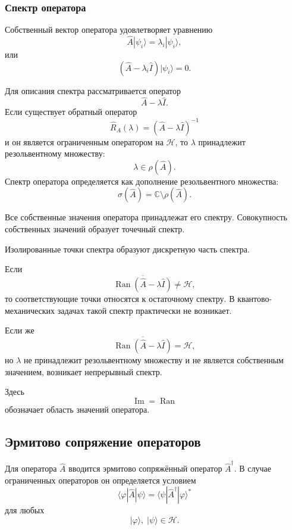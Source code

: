 \documentclass[12pt,a4paper]{article}
\begin{document}
\subsubsection{Спектр оператора}

Собственный вектор оператора удовлетворяет уравнению
\[
    \boxed{
        \hat A|\psi_i\rangle
        =
        \lambda_i|\psi_i\rangle
    },
\]
или
\[
    \boxed{
        (\hat A-\lambda_i\hat I)
        |\psi_i\rangle
        =
        0
    }.
\]

Для описания спектра рассматривается оператор
\[
    \hat A-\lambda\hat I.
\]
Если существует обратный оператор
\[
    \boxed{
        \hat R_A(\lambda)
        =
        (\hat A-\lambda\hat I)^{-1}
    }
\]
и он является ограниченным оператором на $\mathcal H$, то
$\lambda$ принадлежит резольвентному множеству:
\[
    \lambda\in\rho(\hat A).
\]
Спектр оператора определяется как дополнение резольвентного множества:
\[
    \boxed{
        \sigma(\hat A)
        =
        \mathbb C\setminus\rho(\hat A)
    }.
\]

Все собственные значения оператора принадлежат его спектру.
Совокупность собственных значений образует точечный спектр.

Изолированные точки спектра образуют дискретную часть спектра.

Если
\[
    \overline{
        \operatorname{Ran}
        (\hat A-\lambda\hat I)
    }
    \neq
    \mathcal H,
\]
то соответствующие точки относятся к остаточному спектру. В
квантово-механических задачах такой спектр практически не возникает.

Если же
\[
    \boxed{
    \overline{
        \operatorname{Ran}
        (\hat A-\lambda\hat I)
    }
    =
    \mathcal H
    },
\]
но $\lambda$ не принадлежит резольвентному множеству и не является
собственным значением, возникает непрерывный спектр.

Здесь
\[
    \operatorname{Im}
    =
    \operatorname{Ran}
\]
обозначает область значений оператора.


\subsection{Эрмитово сопряжение операторов}

Для оператора $\hat A$ вводится эрмитово сопряжённый оператор
$\hat A^\dagger$. В случае ограниченных операторов он определяется
условием
\[
    \boxed{
    \langle\varphi|\hat A|\psi\rangle
    =
    \langle\psi|\hat A^\dagger|\varphi\rangle^*
    }
\]
для любых
\[
    |\varphi\rangle,\;|\psi\rangle\in\mathcal H.
\]
\end{document}
